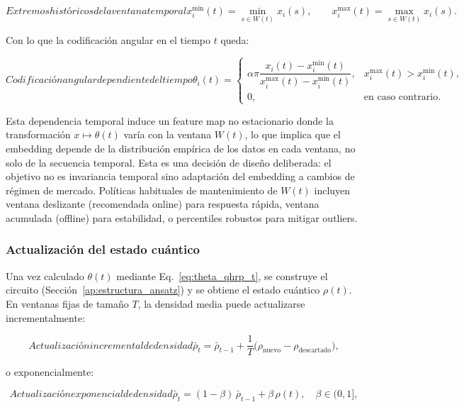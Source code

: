 \begin{equation}[eq:extremos_historiales]{Extremos históricos de la ventana temporal}
x_i^{\min}(t) = \min_{s\in W(t)} x_i(s),\qquad x_i^{\max}(t) = \max_{s\in W(t)} x_i(s).
\end{equation}

Con lo que la codificación angular en el tiempo $t$ queda:

\begin{equation}[eq:theta_qhrp_t]{Codificación angular dependiente del tiempo}
\theta_i(t)=\begin{cases}
\alpha\pi\dfrac{x_i(t)-x_i^{\min}(t)}{x_i^{\max}(t)-x_i^{\min}(t)}, & x_i^{\max}(t)>x_i^{\min}(t),\\
0, & \text{en caso contrario}.
\end{cases}
\end{equation}

Esta dependencia temporal induce un feature map no estacionario donde la transformación $x\mapsto\theta(t)$ varía con la ventana $W(t)$, lo que implica que el embedding depende de la distribución empírica de los datos en cada ventana, no solo de la secuencia temporal. Esta es una decisión de diseño deliberada: el objetivo no es invariancia temporal sino adaptación del embedding a cambios de régimen de mercado. Políticas habituales de mantenimiento de $W(t)$ incluyen ventana deslizante (recomendada online) para respuesta rápida, ventana acumulada (offline) para estabilidad, o percentiles robustos para mitigar outliers.


\subsubsection{Actualización del estado cuántico}
Una vez calculado $\theta(t)$ mediante Eq.~\eqref{eq:theta_qhrp_t}, se construye el circuito (Sección~\ref{ap:estructura_ansatz}) y se obtiene el estado cuántico $\rho(t)$. En ventanas fijas de tamaño $T$, la densidad media puede actualizarse incrementalmente:

\begin{equation}[eq:densidad_media_incremental]{Actualización incremental de densidad}
\bar{\rho}_t = \bar{\rho}_{t-1} + \frac{1}{T}\big(\rho_{\text{nuevo}} - \rho_{\text{descartado}}\big),
\end{equation}

o exponencialmente:

\begin{equation}[eq:densidad_media_exponencial]{Actualización exponencial de densidad}
\bar{\rho}_t = (1-\beta)\,\bar{\rho}_{t-1} + \beta\,\rho(t), \quad \beta\in(0,1],
\end{equation}

